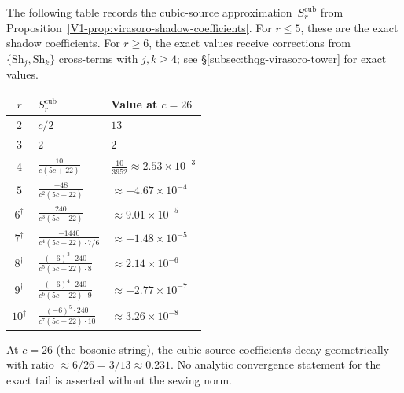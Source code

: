 \begin{computation}

The following table records the cubic-source
approximation~$S_r^{\mathrm{cub}}$ from
Proposition~\ref{V1-prop:virasoro-shadow-coefficients}.
For $r \leq 5$, these are the exact shadow coefficients.
For $r \geq 6$, the exact values receive corrections from
$\{\mathrm{Sh}_j, \mathrm{Sh}_k\}$ cross-terms with
$j,k \geq 4$; see
\S\ref{subsec:thqg-virasoro-tower} for exact values.

\begin{center}
\renewcommand{\arraystretch}{1.5}
\small
\begin{tabular}{cll}
\toprule
$r$ & $S_r^{\mathrm{cub}}$ & Value at $c = 26$ \\
\midrule
$2$ & $c/2$ & $13$ \\
$3$ & $2$ & $2$ \\
$4$ & $\displaystyle\frac{10}{c(5c+22)}$
 & $\displaystyle\frac{10}{3952}
 \approx 2.53 \times 10^{-3}$ \\
$5$ & $\displaystyle\frac{-48}{c^2(5c+22)}$
 & $\approx -4.67 \times 10^{-4}$ \\
$6^{\dagger}$ & $\displaystyle\frac{240}{c^3(5c+22)}$
 & $\approx 9.01 \times 10^{-5}$ \\
$7^{\dagger}$ & $\displaystyle\frac{-1440}{c^4(5c+22) \cdot 7/6}$
 & $\approx -1.48 \times 10^{-5}$ \\
$8^{\dagger}$ & $\displaystyle\frac{(-6)^3 \cdot 240}
 {c^5(5c+22) \cdot 8}$
 & $\approx 2.14 \times 10^{-6}$ \\
$9^{\dagger}$ & $\displaystyle\frac{(-6)^4 \cdot 240}
 {c^6(5c+22) \cdot 9}$
 & $\approx -2.77 \times 10^{-7}$ \\
$10^{\dagger}$ & $\displaystyle\frac{(-6)^5 \cdot 240}
 {c^7(5c+22) \cdot 10}$
 & $\approx 3.26 \times 10^{-8}$ \\
\bottomrule
\end{tabular}
\end{center}


\smallskip
\noindent At $c = 26$ (the bosonic string), the cubic-source
coefficients decay geometrically with ratio
$\approx 6/26 = 3/13 \approx 0.231$. No analytic convergence statement
for the exact tail is asserted without the sewing norm.
\end{computation}

